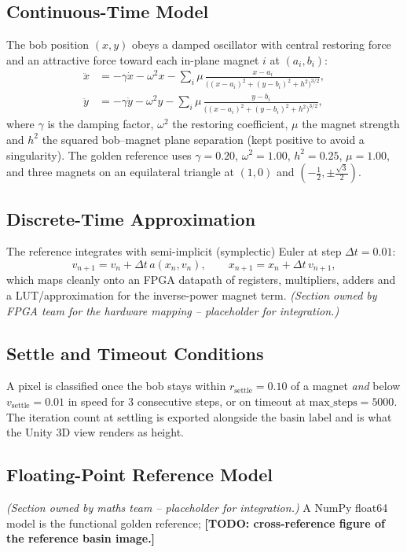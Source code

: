 \documentclass[11pt,a4paper]{article}
\newcommand{\todo}[1]{\textcolor{red!75!black}{\textbf{[TODO: #1]}}}
\newcommand{\owned}[1]{\textit{\small(Section owned by #1 -- placeholder for integration.)}}
\begin{document}
\subsection{Continuous-Time Model}
The bob position $(x,y)$ obeys a damped oscillator with central restoring force
and an attractive force toward each in-plane magnet $i$ at $(a_i,b_i)$:
\begin{align}
\ddot{x} &= -\gamma\dot{x} - \omega^2 x
   - \sum_i \mu\,\frac{x-a_i}{\big((x-a_i)^2+(y-b_i)^2+h^2\big)^{3/2}}, \\
\ddot{y} &= -\gamma\dot{y} - \omega^2 y
   - \sum_i \mu\,\frac{y-b_i}{\big((x-a_i)^2+(y-b_i)^2+h^2\big)^{3/2}},
\end{align}
where $\gamma$ is the damping factor, $\omega^2$ the restoring coefficient,
$\mu$ the magnet strength and $h^2$ the squared bob--magnet plane separation
(kept positive to avoid a singularity). The golden reference uses
$\gamma=0.20$, $\omega^2=1.00$, $h^2=0.25$, $\mu=1.00$, and three magnets on an
equilateral triangle at $(1,0)$ and $(-\tfrac12,\pm\tfrac{\sqrt3}{2})$.

\subsection{Discrete-Time Approximation}
The reference integrates with semi-implicit (symplectic) Euler at step
$\Delta t = 0.01$:
\[
v_{n+1}=v_n+\Delta t\,a(x_n,v_n),\qquad x_{n+1}=x_n+\Delta t\,v_{n+1},
\]
which maps cleanly onto an FPGA datapath of registers, multipliers, adders and
a LUT/approximation for the inverse-power magnet term. \owned{FPGA team for the
hardware mapping}

\subsection{Settle and Timeout Conditions}
A pixel is classified once the bob stays within $r_\text{settle}=0.10$ of a
magnet \emph{and} below $v_\text{settle}=0.01$ in speed for
$3$ consecutive steps, or on timeout at $\text{max\_steps}=5000$. The iteration
count at settling is exported alongside the basin label and is what the Unity
3D view renders as height.

\subsection{Floating-Point Reference Model}
\owned{maths team} A NumPy float64 model is the functional golden reference;
\todo{cross-reference figure of the reference basin image.}
\end{document}
